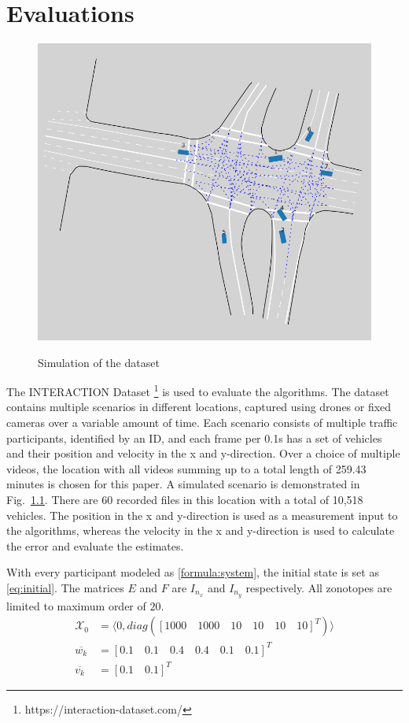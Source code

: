 \chapter{Evaluations} \label{ch:result}
\begin{figure}[H]
\centering
\caption{Simulation of the dataset}
\includegraphics[width=0.5\linewidth,scale=0.25]{figures/dataset}
\label{fig:dataset}
\end{figure}
The INTERACTION Dataset \footnote{https://interaction-dataset.com/} is used to evaluate the algorithms. The dataset contains multiple scenarios in different locations, captured using drones or fixed cameras over a variable amount of time. Each scenario consists of multiple traffic participants, identified by an ID, and each frame per 0.1s has a set of vehicles and their position and velocity in the x and y-direction. Over a choice of multiple videos, the location with all videos summing up to a total length of 259.43 minutes is chosen for this paper. A simulated scenario is demonstrated in Fig.~\ref{fig:dataset}. There are 60 recorded files in this location with a total of 10,518 vehicles. The position in the x and y-direction is used as a measurement input to the algorithms, whereas the velocity in the x and y-direction is used to calculate the error and evaluate the estimates. 

With every participant modeled as \eqref{formula:system}, the initial state is set as \eqref{eq:initial}. The matrices $E$ and $F$ are $I_{n_x}$ and $I_{n_y}$ respectively. All zonotopes are limited to maximum order of $20$. 
\begin{equation}
\label{eq:initial}
\begin{split}
\mathcal{X}_0 &= \langle 0, diag([1000\quad 1000\quad 10 \quad10\quad 10\quad 10]^T) \rangle\\
\overline{w_k} &= [0.1\quad 0.1\quad 0.4\quad 0.4\quad 0.1\quad 0.1]^T\\
\overline{v_k} &= [0.1\quad 0.1]^T
\end{split}
\end{equation}

